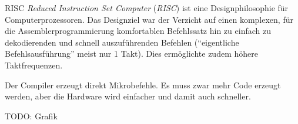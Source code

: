 \begin{defi}[Befehlssatzarchitektur]{RISC}
    \emph{Reduced Instruction Set Computer} (\emph{RISC}) ist eine Designphilosophie für Computerprozessoren.
    Das Designziel war der Verzicht auf einen komplexen, für die Assemblerprogrammierung komfortablen Befehlssatz hin zu einfach zu dekodierenden und schnell auszuführenden Befehlen (\enquote{eigentliche Befehlsausführung} meist nur 1 Takt).
    Dies ermöglichte zudem höhere Taktfrequenzen.

    Der Compiler erzeugt direkt Mikrobefehle.
    Es muss zwar mehr Code erzeugt werden, aber die Hardware wird einfacher und damit auch schneller.

    TODO: Grafik
\end{defi}